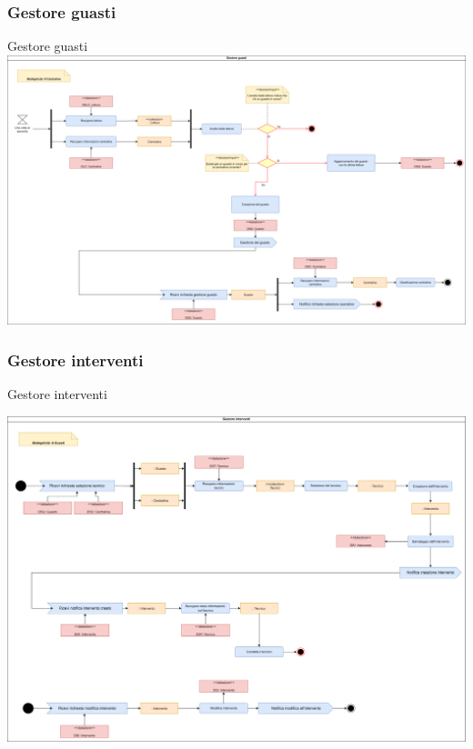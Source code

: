 \documentclass{beamer}
\begin{document}
	\begin{frame}
		\subsubsection{Gestore guasti}	
		\begin{block}{Gestore guasti}
			\includegraphics[width=\textwidth, height=0.85\textheight, keepaspectratio=true]{comp2.png}
		\end{block}
	\end{frame}	
	
	\begin{frame}
		\subsubsection{Gestore interventi}	
		\begin{block}{Gestore interventi}
			\begin{center}
				\includegraphics[width=\textwidth, height=0.85\textheight, keepaspectratio=true]{comp3.png}
			\end{center}
		\end{block}
	\end{frame}	
	
\end{document}
